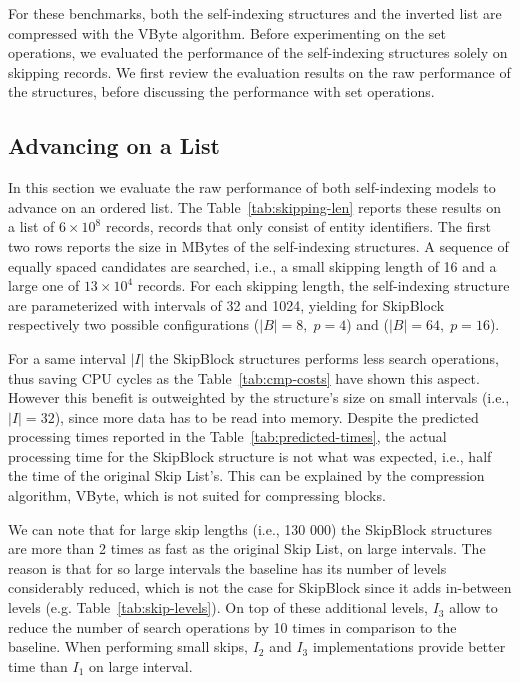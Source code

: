For these benchmarks, both the self-indexing structures and the inverted list
are compressed with the VByte algorithm.
Before experimenting on the set operations, we evaluated the performance of the
self-indexing structures solely on skipping records. We first review the
evaluation results on the raw performance of the structures, before discussing
the performance with set operations.

\subsection{Advancing on a List}

In this section we evaluate the raw performance of both self-indexing models to
advance on an ordered list. The Table~\ref{tab:skipping-len} reports these
results on a list of $6\times 10^{8}$ records, records that only consist of
entity identifiers.
The first two rows reports the size in MBytes of the self-indexing structures.
A sequence of equally spaced candidates are searched,
i.e., a small skipping length of 16 and a large one of $13\times 10^{4}$
records. For each skipping length, the self-indexing structure are
parameterized with intervals of 32 and 1024, yielding for SkipBlock
respectively two possible configurations ($\vert B \vert =8, \;p=4$) and
($\vert B \vert =64, \;p=16$). 

For a same interval $\vert I \vert$ the SkipBlock structures
performs less search operations, thus saving CPU cycles as the
Table~\ref{tab:cmp-costs} have shown this aspect. However this benefit is
outweighted by the structure's size on small intervals (i.e., $\vert I \vert =
32$), since more data has to be read into memory.
Despite the predicted processing times reported in the
Table~\ref{tab:predicted-times}, the actual processing time for the SkipBlock
structure is not what was expected, i.e., half the time of the original Skip
List's. This can be explained by the compression algorithm, VByte, which is not
suited for compressing blocks.

We can note that for large skip lengths (i.e., 130 000) the SkipBlock
structures are more than 2 times as fast as the original Skip List, on large
intervals. The reason is that for so large intervals the baseline has its
number of levels considerably reduced, which is not the case for SkipBlock
since it adds in-between levels (e.g. Table~\ref{tab:skip-levels}). On top of
these additional levels, $I_3$ allow to reduce the number of search operations
by 10 times in comparison to the baseline.
When performing small skips, $I_2$ and $I_3$ implementations provide better
time than $I_1$ on large interval.

